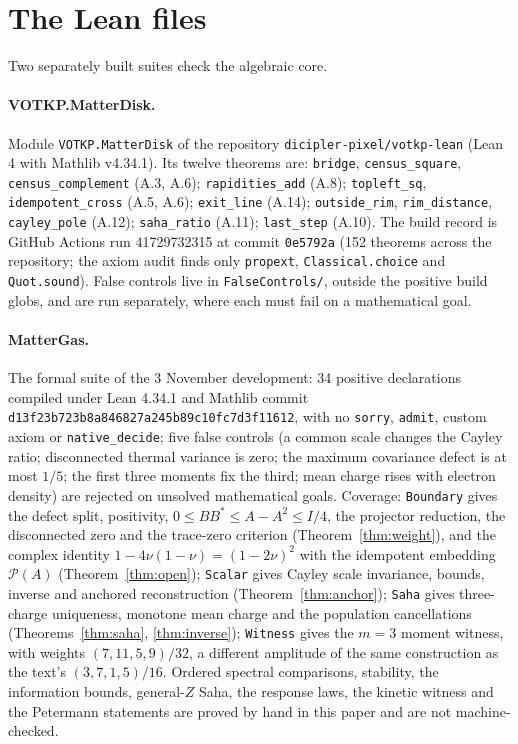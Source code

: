 \section{The Lean files}
Two separately built suites check the algebraic core.

\paragraph{VOTKP.MatterDisk.} Module \texttt{VOTKP.MatterDisk} of the repository \texttt{dicipler-pixel/votkp-lean} (Lean 4 with Mathlib v4.34.1). Its twelve theorems are: \texttt{bridge}, \texttt{census\_square}, \texttt{census\_complement} (A.3, A.6); \texttt{rapidities\_add} (A.8); \texttt{topleft\_sq}, \texttt{idempotent\_cross} (A.5, A.6); \texttt{exit\_line} (A.14); \texttt{outside\_rim}, \texttt{rim\_distance}, \texttt{cayley\_pole} (A.12); \texttt{saha\_ratio} (A.11); \texttt{last\_step} (A.10). The build record is GitHub Actions run 41729732315 at commit \texttt{0e5792a} (152 theorems across the repository; the axiom audit finds only \texttt{propext}, \texttt{Classical.choice} and \texttt{Quot.sound}). False controls live in \texttt{FalseControls/}, outside the positive build globs, and are run separately, where each must fail on a mathematical goal.



\paragraph{MatterGas.} The formal suite of the 3 November development: 34 positive declarations compiled under Lean 4.34.1 and Mathlib commit \texttt{d13f23b723b8a846827a245b89c10fc7d3f11612}, with no \texttt{sorry}, \texttt{admit}, custom axiom or \texttt{native\_decide}; five false controls (a common scale changes the Cayley ratio; disconnected thermal variance is zero; the maximum covariance defect is at most $1/5$; the first three moments fix the third; mean charge rises with electron density) are rejected on unsolved mathematical goals. Coverage: \texttt{Boundary} gives the defect split, positivity, $0\le BB^*\le A-A^2\le I/4$, the projector reduction, the disconnected zero and the trace-zero criterion (Theorem~\ref{thm:weight}), and the complex identity $1-4\nu(1-\nu)=(1-2\nu)^2$ with the idempotent embedding $\mathcal P(A)$ (Theorem~\ref{thm:open}); \texttt{Scalar} gives Cayley scale invariance, bounds, inverse and anchored reconstruction (Theorem~\ref{thm:anchor}); \texttt{Saha} gives three-charge uniqueness, monotone mean charge and the population cancellations (Theorems~\ref{thm:saha}, \ref{thm:inverse}); \texttt{Witness} gives the $m=3$ moment witness, with weights $(7,11,5,9)/32$, a different amplitude of the same construction as the text's $(3,7,1,5)/16$. Ordered spectral comparisons, stability, the information bounds, general-$Z$ Saha, the response laws, the kinetic witness and the Petermann statements are proved by hand in this paper and are not machine-checked.

